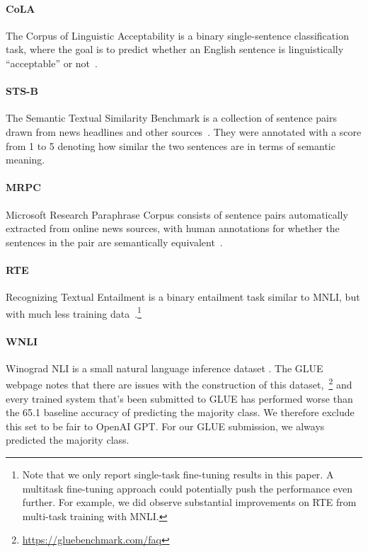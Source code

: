 \paragraph{CoLA} The Corpus of Linguistic Acceptability is a binary single-sentence classification task, where the goal is to predict whether an English sentence is linguistically ``acceptable'' or not~\cite{warstadt-singh-bowman:2018:_corpus}.

\paragraph{STS-B} The Semantic Textual Similarity Benchmark is a collection of sentence pairs drawn from news headlines and other sources~\cite{cer-etal:2017}. They were annotated with a score from 1 to 5 denoting how similar the two sentences are in terms of semantic meaning. 

\paragraph{MRPC} Microsoft Research Paraphrase Corpus consists of sentence pairs automatically extracted from online news sources, with human annotations for whether the sentences in the pair are semantically equivalent~\cite{dolan-brockett:2005:_autom}.

\paragraph{RTE} Recognizing Textual Entailment is a binary entailment task similar to MNLI, but with much less training data~\cite{bentivogli-etal:2009}.\footnote{Note that we only report single-task fine-tuning results in this paper. A multitask fine-tuning approach could potentially push
the performance even further. For example, we did observe substantial improvements on RTE from multi-task training with MNLI.}

\paragraph{WNLI} Winograd NLI is a small natural language inference dataset \cite{levesque-davis-morgenstern:2011:_winog}. The GLUE webpage notes that there are issues with the construction of this dataset,~\footnote{\url{https://gluebenchmark.com/faq}} and every trained system that's been submitted to GLUE has performed worse than the 65.1 baseline accuracy of predicting the majority class. We therefore exclude this set to be fair to OpenAI GPT. For our GLUE submission, we always predicted the majority class.



